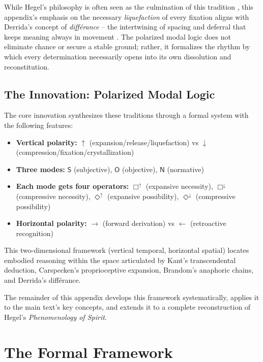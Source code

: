 \documentclass[12pt]{book}
\begin{document}
While Hegel's philosophy is often seen as the culmination of this tradition \parencite{Derrida:1973, agamben_language_2006}, this appendix's emphasis on the necessary \textit{liquefaction} of every fixation aligns with Derrida's concept of \textit{différance} -- the intertwining of spacing and deferral that keeps meaning always in movement \parencite{Derrida:1973}. The polarized modal logic does not eliminate chance or secure a stable ground; rather, it formalizes the rhythm by which every determination necessarily opens into its own dissolution and reconstitution.

\subsection{The Innovation: Polarized Modal Logic}

The core innovation synthesizes these traditions through a formal system with the following features:

\begin{itemize}
\item \textbf{Vertical polarity:} $\uparrow$ (expansion/release/liquefaction) vs $\downarrow$ (compression/fixation/crystallization)
\item \textbf{Three modes:} $\mathsf{S}$ (subjective), $\mathsf{O}$ (objective), $\mathsf{N}$ (normative)
\item \textbf{Each mode gets four operators:} $\Box^{\uparrow}$ (expansive necessity), $\Box^{\downarrow}$ (compressive necessity), $\Diamond^{\uparrow}$ (expansive possibility), $\Diamond^{\downarrow}$ (compressive possibility)
\item \textbf{Horizontal polarity:} $\rightarrow$ (forward derivation) vs $\leftarrow$ (retroactive recognition)
\end{itemize}

This two-dimensional framework (vertical temporal, horizontal spatial) locates embodied reasoning within the space articulated by Kant's transcendental deduction, Carspecken's proprioceptive expansion, Brandom's anaphoric chains, and Derrida's différance.

The remainder of this appendix develops this framework systematically, applies it to the main text's key concepts, and extends it to a complete reconstruction of Hegel's \emph{Phenomenology of Spirit}.

\section{The Formal Framework}
\end{document}
